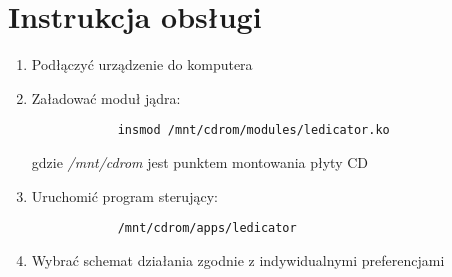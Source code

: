 \documentclass[a4paper,12pt]{article}
\begin{document}
\section{Instrukcja obsługi}
	\begin{enumerate}
		\item Podłączyć urządzenie do komputera
		\item Załadować moduł jądra:
			\begin{verbatim}
			insmod /mnt/cdrom/modules/ledicator.ko
			\end{verbatim}
			gdzie \textit{/mnt/cdrom} jest punktem montowania płyty CD
		\item Uruchomić program sterujący:
			\begin{verbatim}
			/mnt/cdrom/apps/ledicator
			\end{verbatim}
		\item Wybrać schemat działania zgodnie z indywidualnymi preferencjami
	\end{enumerate}
\end{document}
